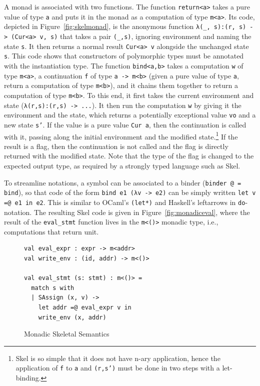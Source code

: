 \documentclass[submission,copyright,creativecommons]{eptcs}
\newcommand{\skinl}[1]{\texttt{#1}}
\begin{document}
A monad is associated with two functions. The function \skinl{return<a>} takes a
pure value of type \skinl{a} and puts it in the monad as a computation of type
\skinl{m<a>}. Its code, depicted in Figure~\ref{fig:skelmonad}, is the anonymous function
\skinl{λ(_, s):(r, s) -> (Cur<a> v, s)} that takes
a pair \skinl{(_,s)}, ignoring environment and naming the state \skinl{s}. It then returns a normal
result \skinl{Cur<a> v} alongside the unchanged state \skinl{s}. This code shows
that constructors of polymorphic types must be annotated with the instantiation
type. The function \skinl{bind<a,b>} takes a computation \skinl{w} of type
\skinl{m<a>}, a continuation \skinl{f} of type \skinl{a -> m<b>} (given a pure
value of type \skinl{a}, return a computation of type \skinl{m<b>}), and it
chains them together to return a computation of type \skinl{m<b>}. To this end,
it first takes the current environment and state (\skinl{λ(r,s):(r,s) -> ...}). It
then run the computation \skinl{w} by giving it the environment and the state,
which returns a potentially exceptional value \skinl{vo} and a new state
\skinl{s'}. If the value is a pure value \skinl{Cur a}, then the continuation is
called with it, passing along the initial environment and the modified
state.\footnote{Skel is so simple that it does not have n-ary application, hence
  the application of \skinl{f} to \skinl{a} and \skinl{(r,s')} must be done in
  two steps with a let-binding.} If the result is a flag, then the continuation
is not called and the flag is directly returned with the modified state. Note
that the type of the flag is changed to the expected output type, as required by
a strongly typed language such as Skel.

To streamline notations, a symbol can be associated to a binder (\skinl{binder @
= bind}), so that code of the form \skinl{bind e1 (λv -> e2)} can be simply
written \skinl{let v =@ e1 in e2}.
This is similar to OCaml's \texttt{(let*)} and Haskell's leftarrows in \texttt{do}-notation.
The resulting Skel code is given in Figure~\vref{fig:monadiceval}, where the
result of the \skinl{eval_stmt} function lives in the \skinl{m<()>} monadic
type, i.e., computations that return unit.

\begin{figure}
\centering
\begin{minipage}{0.37\textwidth}
\begin{verbatim}
val eval_expr : expr -> m<addr>
val write_env : (id, addr) -> m<()>

val eval_stmt (s: stmt) : m<()> =
  match s with
  | SAssign (x, v) ->
    let addr =@ eval_expr v in
    write_env (x, addr)
\end{verbatim}
\end{minipage}
\caption{\label{fig:monadiceval}Monadic Skeletal Semantics}
\end{figure}
\end{document}

